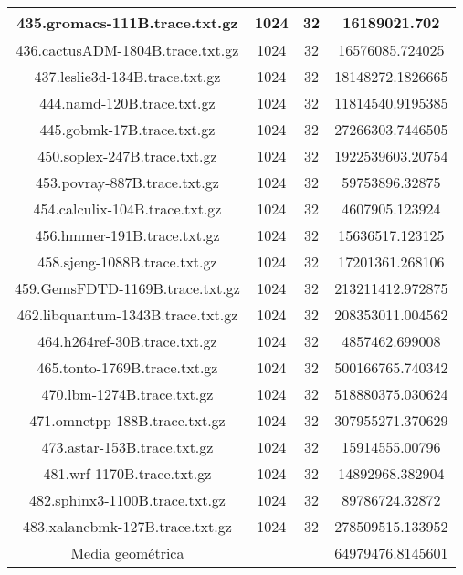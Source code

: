 \begin{table}[H]
\begin{center}
{\begin{tabular}{|c|c|c|c|}
		\hline
		435.gromacs-111B.trace.txt.gz	&	1024	&	32	&	16189021.702	\\
		\hline
		436.cactusADM-1804B.trace.txt.gz	&	1024	&	32	&	16576085.724025	\\
		\hline
		437.leslie3d-134B.trace.txt.gz	&	1024	&	32	&	18148272.1826665	\\
		\hline
		444.namd-120B.trace.txt.gz	&	1024	&	32	&	11814540.9195385	\\
		\hline
		445.gobmk-17B.trace.txt.gz	&	1024	&	32	&	27266303.7446505	\\
		\hline
		450.soplex-247B.trace.txt.gz	&	1024	&	32	&	1922539603.20754	\\
		\hline
		453.povray-887B.trace.txt.gz	&	1024	&	32	&	59753896.32875	\\
		\hline
		454.calculix-104B.trace.txt.gz	&	1024	&	32	&	4607905.123924	\\
		\hline
		456.hmmer-191B.trace.txt.gz	&	1024	&	32	&	15636517.123125	\\
		\hline
		458.sjeng-1088B.trace.txt.gz	&	1024	&	32	&	17201361.268106	\\
		\hline
		459.GemsFDTD-1169B.trace.txt.gz	&	1024	&	32	&	213211412.972875	\\
		\hline
		462.libquantum-1343B.trace.txt.gz	&	1024	&	32	&	208353011.004562	\\
		\hline
		464.h264ref-30B.trace.txt.gz	&	1024	&	32	&	4857462.699008	\\
		\hline
		465.tonto-1769B.trace.txt.gz	&	1024	&	32	&	500166765.740342	\\
		\hline
		470.lbm-1274B.trace.txt.gz	&	1024	&	32	&	518880375.030624	\\
		\hline
		471.omnetpp-188B.trace.txt.gz	&	1024	&	32	&	307955271.370629	\\
		\hline
		473.astar-153B.trace.txt.gz	&	1024	&	32	&	15914555.00796	\\
		\hline
		481.wrf-1170B.trace.txt.gz	&	1024	&	32	&	14892968.382904	\\
		\hline
		482.sphinx3-1100B.trace.txt.gz	&	1024	&	32	&	89786724.32872	\\
		\hline
		483.xalancbmk-127B.trace.txt.gz	&	1024	&	32	&	278509515.133952	\\
		\hline
		\hline
		Media geométrica	&	&		&	64979476.8145601	\\
		\hline
	\end{tabular}%
}
\end{center}
\end{table}

















